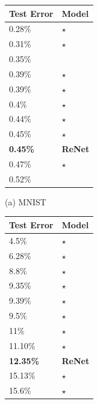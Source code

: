 \begin{table}[t]
    \centering

    \begin{minipage}{0.45\textwidth}
        \centering

        \begin{tabular}{l |  l}
            Test Error & Model  \\
            \hline
0.28\% & \citep{DBLP:conf/icml/WanZZLF13}$\star$ \\
0.31\% & \citep{DBLP:journals/corr/Graham14}$\star$ \\
0.35\% & \citep{DBLP:journals/corr/abs-1003-0358} \\
0.39\% & \citep{DBLP:conf/nips/MairalKHS14}$\star$ \\
0.39\% & \citep{DBLP:journals/corr/LeeXGZT14}$\star$ \\
0.4\% & \citep{DBLP:conf/icdar/SimardSP03}$\star$ \\
0.44\% & \citep{DBLP:journals/corr/Graham14a}$\star$ \\
0.45\% & \citep{Goodfellow2013}$\star$ \\
\bf{0.45\%} & \bf{ReNet} \\
0.47\% & \citep{Lin2014}$\star$ \\
0.52\% & \citep{DBLP:journals/pami/AzzopardiA13} \\
        \end{tabular}

            \vspace{2mm}
            (a) MNIST
        \end{minipage}
        \hfill
        \begin{minipage}{0.45\textwidth}
            \centering

            \begin{tabular}{l |  l}
                Test Error & Model  \\
                \hline
    4.5\% & \citep{DBLP:journals/corr/Graham14a}$\star$ \\
    6.28\% & \citep{DBLP:journals/corr/Graham14}$\star$ \\
    8.8\% & \citep{Lin2014}$\star$ \\
    9.35\% & \citep{Goodfellow2013}$\star$ \\
    9.39\% & \citep{DBLP:journals/corr/SpringenbergR13}$\star$ \\
    9.5\% & \citep{DBLP:conf/nips/SnoekLA12}$\star$ \\
    11\% & \citep{Krizhevsky-2012}$\star$ \\
    11.10\% & \citep{DBLP:conf/icml/WanZZLF13}$\star$ \\
    \bf{12.35\%} & \bf{ReNet} \\
    15.13\% & \citep{DBLP:journals/corr/abs-1301-3557}$\star$ \\
    15.6\% & \citep{DBLP:journals/corr/abs-1207-0580}$\star$ \\
            \end{tabular}


\end{minipage}
\end{table}
